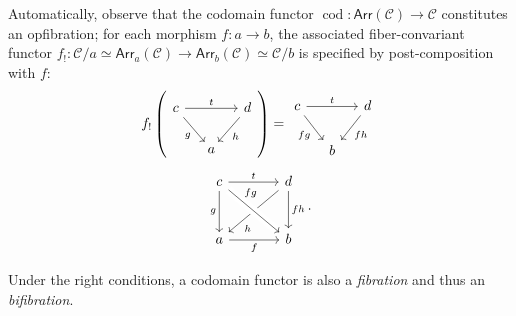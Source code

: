 \documentclass[12pt]{article}
\theoremstyle{definition}
\theoremstyle{remark}
\DeclareMathOperator{\cod}{cod}
\newcommand{\arr}{\mathsf{Arr}} %
\newcommand{\catC}{\mathcal{C}}
\begin{document}
Automatically, observe that the codomain functor $\cod : \arr(\catC) \to \catC$ constitutes an opfibration; for each morphism $f : a \to b$, the associated fiber-convariant functor $f_{!} : \catC / a \simeq \arr_{a}(\catC) \to \arr_{b}(\catC) \simeq \catC / b$ is specified by post-composition with $f$:
\begin{equation}
    f_! \left(
        \begin{tikzcd}[column sep=small]
            c \ar[dr, "g"'] \ar[rr, "t"] & & d \ar[dl, "h"] \\
            & a &
        \end{tikzcd}
    \right)
    =
    \begin{tikzcd}[column sep=small]
    c \ar[dr, "f g"'] \ar[rr, "t"] & & d \ar[dl, "f h"] \\
    & b &
    \end{tikzcd}
\end{equation}
\begin{equation}
    \begin{tikzcd}[sep=large]
        c \ar[d, "g"'] \ar[r, "t"] & d \ar[dl, "h", near end] \ar[d, "f h"] \\
        a \ar[r, "f"'] & b \ar[from=ul, "f g", near start, crossing over]
    \end{tikzcd}.
\end{equation}

Under the right conditions, a codomain functor is also a \textit{fibration} and thus an \textit{bifibration}.
\end{document}

